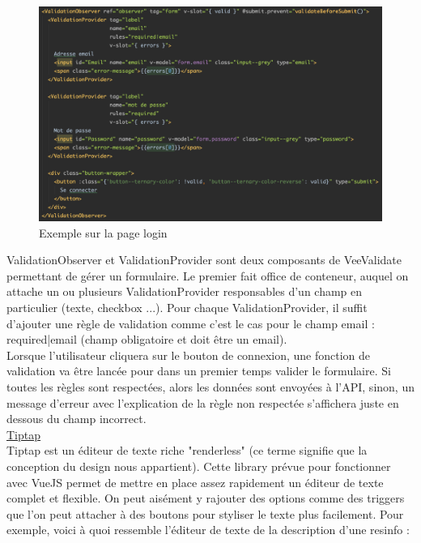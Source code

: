 \begin{figure}[H]
    \includegraphics[width=\textwidth,height=0.35\textheight,keepaspectratio]{images/libraries/veevalidate.png}
    \centering
    \caption[VeeValidate : Exemple d'utilisation]{Exemple sur la page login}
\end{figure}

ValidationObserver et ValidationProvider sont deux composants de VeeValidate permettant de gérer un formulaire. Le premier fait office de conteneur, auquel on attache un ou plusieurs ValidationProvider responsables d'un champ en particulier (texte, checkbox ...). Pour chaque ValidationProvider, il suffit d'ajouter une règle de validation comme c'est le cas pour le champ email : required|email (champ obligatoire et doit être un email).\\

Lorsque l'utilisateur cliquera sur le bouton de connexion, une fonction de validation va être lancée pour dans un premier temps valider le formulaire. Si toutes les règles sont respectées, alors les données sont envoyées à l'API, sinon, un message d'erreur avec l'explication de la règle non respectée s'affichera juste en dessous du champ incorrect.\\

\pagebreak
\noindent\underline{\href{https://tiptap.scrumpy.io}{Tiptap}}\\

Tiptap est un éditeur de texte riche "renderless" (ce terme signifie que la conception du design nous appartient). Cette \gls{library} prévue pour fonctionner avec VueJS permet de mettre en place assez rapidement un éditeur de texte complet et flexible. On peut aisément y rajouter des options comme des triggers que l'on peut attacher à des boutons pour styliser le texte plus facilement. Pour exemple, voici à quoi ressemble l'éditeur de texte de la description d'une \gls{resinfo} :\\

